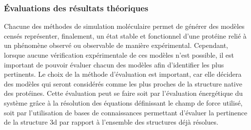 

\subsubsection{Évaluations des résultats théoriques} \label{simu_eval}

Chacune des méthodes de simulation moléculaire permet de générer des modèles censés représenter, finalement, un état stable et fonctionnel d'une protéine relié à un phénomène observé ou observable de manière expérimental. Cependant, lorsque aucune vérification expérimentale de ces modèles n'est possible, il est important de pouvoir évaluer chacun des modèles afin d'identifier les plus pertinents. Le choix de la méthode d'évaluation est important, car elle décidera des modèles qui seront considérés comme les plus proches de la structure native des protéines. Cette évaluation peut se faire soit par l'évaluation énergétique du système grâce à la résolution des équations définissant le champ de force utilisé, soit par l'utilisation de bases de connaissances permettant d'évaluer la pertinence de la structure 3d par rapport à l'ensemble des structures déjà résolues.

